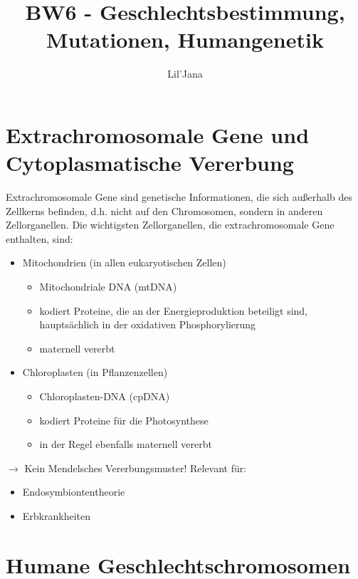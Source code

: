 \documentclass{article}
\title{BW6 - Geschlechtsbestimmung, Mutationen, Humangenetik}
\author{Lil'Jana}
\begin{document}
\maketitle
\section{Extrachromosomale Gene und Cytoplasmatische Vererbung}
Extrachromosomale Gene sind genetische Informationen, die sich außerhalb des Zellkerns befinden, d.h. nicht auf den Chromosomen, sondern in anderen Zellorganellen. Die wichtigsten Zellorganellen, die extrachromosomale Gene enthalten, sind: \newline
\begin{itemize}
    \item Mitochondrien (in allen eukaryotischen Zellen)
    \begin{itemize}
        \item Mitochondriale DNA (mtDNA)
        \item kodiert Proteine, die an der Energieproduktion beteiligt sind, hauptsächlich in der oxidativen Phosphorylierung
        \item maternell vererbt
    \end{itemize}
    \item Chloroplasten (in Pflanzenzellen)
    \begin{itemize}
        \item Chloroplasten-DNA (cpDNA)
        \item kodiert Proteine für die Photosynthese 
        \item in der Regel ebenfalls maternell vererbt
    \end{itemize}
\end{itemize}
$\rightarrow$ Kein Mendelsches Vererbungsmuster! \newline
Relevant für: \newline
\begin{itemize}
    \item Endosymbiontentheorie
    \item Erbkrankheiten
\end{itemize}

\section{Humane Geschlechtschromosomen}
\end{document}
